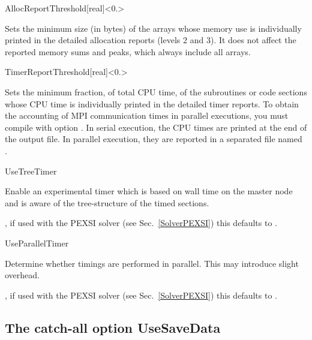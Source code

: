 \begin{fdfentry}{AllocReportThreshold}[real]<$0.$>

Sets the minimum size (in bytes) of the arrays whose memory use is
individually printed in the detailed allocation reports (levels 2 and
3). It does not affect the reported memory sums and peaks, which
always include all arrays.
  
\end{fdfentry}

\begin{fdfentry}{TimerReportThreshold}[real]<$0.$>

  Sets the minimum fraction, of total CPU time, of the subroutines or
  code sections whose CPU time is individually printed in the detailed
  timer reports. To obtain the accounting of MPI communication times
  in parallel executions, you must compile with option
  .
  In serial execution, the CPU times are printed at the end of the
  output file. In parallel execution, they are reported in a separated
  file named .
  
\end{fdfentry}

\begin{fdflogicalF}{UseTreeTimer}

  Enable an experimental timer which is based on wall time on the
  master node and is aware of the tree-structure of the timed
  sections.

  \note, if used with the PEXSI solver (see Sec.~\ref{SolverPEXSI})
  this defaults to \fdftrue.
  
\end{fdflogicalF}

\begin{fdflogicalT}{UseParallelTimer}

  Determine whether timings are performed in parallel. This may
  introduce slight overhead.

  \note, if used with the PEXSI solver (see Sec.~\ref{SolverPEXSI})
  this defaults to \fdffalse.
  
\end{fdflogicalT}



\subsection{The catch-all option UseSaveData}

